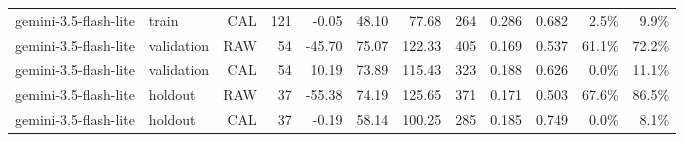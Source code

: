 \begin{table}[htbp]
\begin{tabular}{llrrrrrrrrrr}
gemini-3.5-flash-lite & train & CAL & 121 & -0.05 & 48.10 & 77.68 & 264 & 0.286 & 0.682 & 2.5\% & 9.9\% \\
gemini-3.5-flash-lite & validation & RAW & 54 & -45.70 & 75.07 & 122.33 & 405 & 0.169 & 0.537 & 61.1\% & 72.2\% \\
gemini-3.5-flash-lite & validation & CAL & 54 & 10.19 & 73.89 & 115.43 & 323 & 0.188 & 0.626 & 0.0\% & 11.1\% \\
gemini-3.5-flash-lite & holdout & RAW & 37 & -55.38 & 74.19 & 125.65 & 371 & 0.171 & 0.503 & 67.6\% & 86.5\% \\
gemini-3.5-flash-lite & holdout & CAL & 37 & -0.19 & 58.14 & 100.25 & 285 & 0.185 & 0.749 & 0.0\% & 8.1\% \\
\bottomrule
\end{tabular}
\end{table}

